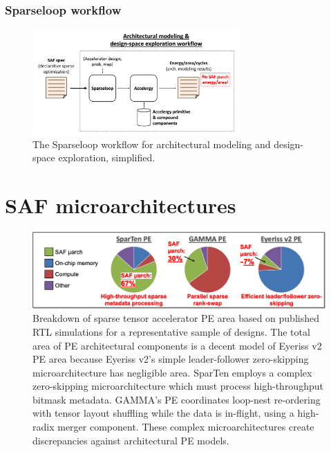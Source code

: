 \subsubsection{Sparseloop workflow}

\begin{figure}[H]
\includegraphics[width=8cm]{figures/sparseloop_workflow.png}
\caption{The Sparseloop workflow for architectural modeling and design-space exploration, simplified.}
\label{fig:sparseloop_workflow}
\end{figure}

\section{SAF microarchitectures}
\label{background:saf_uarch}
%
%
\begin{figure}[H]
\includegraphics[width=\textwidth]{figures/saf_uarch_significance.PNG}
\caption{Breakdown of sparse tensor accelerator PE area based on published RTL simulations for a representative sample of designs. The total area of PE architectural components is a decent model of Eyeriss v2\cite{eyerissv2} PE area because Eyeriss v2's simple leader-follower zero-skipping microarchitecture has negligible area. SparTen\cite{sparten} employs a complex zero-skipping microarchitecture which must process high-throughput bitmask metadata. GAMMA's\cite{gamma} PE coordinates loop-nest re-ordering with tensor layout shuffling while the data is in-flight, using a high-radix merger component. These complex microarchitectures create discrepancies against architectural PE models.}
\label{fig:saf_uarch_significance}
\centering
\end{figure}


